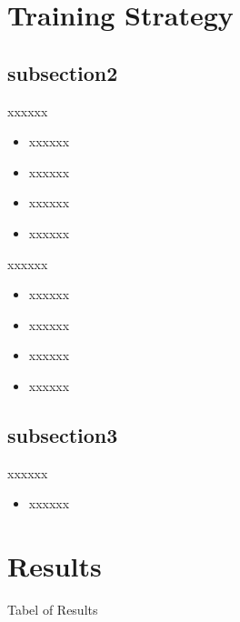 \documentclass{beamer}
\begin{document}
\section{Training Strategy}

\subsection{subsection2}

\begin{frame}{xxxxxx}
    \begin{itemize}
        \item xxxxxx
        \item xxxxxx
        \item xxxxxx
        \item xxxxxx
    \end{itemize}
\end{frame}

\begin{frame}{xxxxxx}
    \begin{itemize}
        \item xxxxxx
        \item xxxxxx
        \item xxxxxx
        \item xxxxxx
    \end{itemize}
\end{frame}
\subsection{subsection3}

\begin{frame}{xxxxxx}
    \begin{itemize}
        \item xxxxxx
    \end{itemize}
\end{frame}

\section{Results}

\begin{frame}{Tabel of Results}
    \begin{table}
        \centering
        \caption{Results - SI-SNR-PIT on test set}
    \end{table}
\end{frame}
\end{document}
